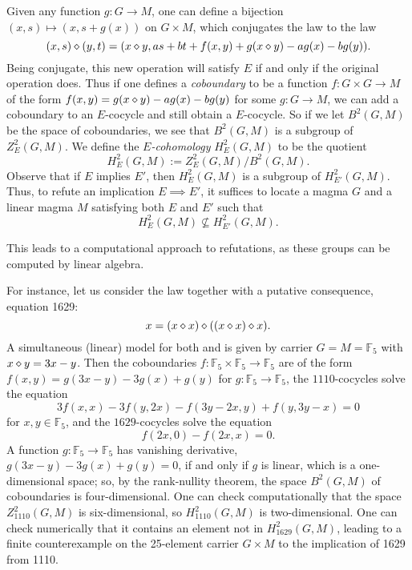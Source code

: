 Given any function $g: G \to M$, one can define a bijection $(x,s) \mapsto (x,s+g(x))$ on $G \times M$, which conjugates the law  to the law
$$ (x,s) \diamond (y,t) = (x \diamond y, as + bt + f(x,y) + g(x \diamond y) - ag(x) - bg(y)).$$
Being conjugate, this new operation will satisfy $E$ if and only if the original operation does.
Thus if one defines a \emph{coboundary} to be a function $f: G \times G \to M$ of the form $f(x,y) =g(x \diamond y) - ag(x) - bg(y)$ for some $g: G \to M$, we can add a coboundary to an $E$-cocycle and still obtain a $E$-cocycle.  So if we let $B^2(G,M)$ be the space of coboundaries, we see that $B^2(G,M)$ is a subgroup of $Z^2_E(G,M)$.  We define the \emph{$E$-cohomology} $H^2_E(G,M)$ to be the quotient
$$ H^2_E(G,M) := Z^2_E(G,M) / B^2(G,M).$$
Observe that if $E$ implies $E'$, then $H^2_E(G,M)$ is a subgroup of $H^2_{E'}(G,M)$.  Thus, to refute an implication $E \implies E'$, it suffices to locate a magma $G$ and a linear magma $M$ satisfying both $E$ and $E'$ such that
\begin{equation}\label{hgm}
  H^2_E(G,M) \not\subseteq H^2_{E'}(G,M).
\end{equation}

This leads to a computational approach to refutations, as these groups can be computed by linear algebra.

For instance, let us consider the law  together with a putative consequence, equation 1629:
\begin{equation}\label{1629}
  x = (x \diamond x) \diamond ((x \diamond x) \diamond x).
\end{equation}
A simultaneous (linear) model for both  and  is given by carrier $G=M={\mathbb F}_5$ with $x \diamond y = 3x-y$.  Then the coboundaries $f: {\mathbb F}_5 \times {\mathbb F}_5 \to {\mathbb F}_5$ are of the form $f(x,y) = g(3x-y) - 3g(x) + g(y)$ for $g: {\mathbb F}_5 \to {\mathbb F}_5$, the $1110$-cocycles solve the equation
$$3 f(x,x) - 3 f(y, 2x) - f(3y - 2x, y) + f( y, 3y - x) = 0$$
for $x,y \in {\mathbb F}_5$, and the $1629$-cocycles solve the equation
$$ f(2x,0) - f(2x,x) = 0.$$
A function $g:{\mathbb F}_5 \to {\mathbb F}_5$ has vanishing derivative, $g(3x-y) - 3g(x) + g(y) = 0$, if and only if $g$ is linear, which is a one-dimensional space; so, by the rank-nullity theorem, the space $B^2(G,M)$ of coboundaries is four-dimensional.  One can check computationally that the space $Z^2_{1110}(G,M)$ is six-dimensional, so $H^2_{1110}(G,M)$ is two-dimensional.  One can check numerically that it contains an element not in $H^2_{1629}(G,M)$, leading to a finite counterexample on the 25-element carrier $G \times M$ to the implication of 1629 from 1110.

